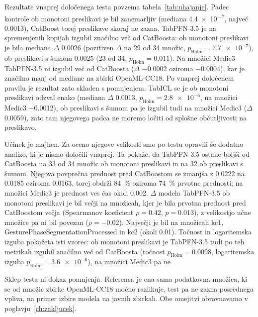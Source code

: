 \documentclass[a4paper,12pt,openright]{book}
\begin{document}
Rezultate vnaprej določenega testa povzema tabela~\ref{tab:uhajanje}. Padec
kontrole ob monotoni preslikavi je bil zanemarljiv (mediana \num{4.4e-7},
največ \num{0.0013}), CatBoost torej preslikave skoraj ne zazna.
TabPFN-3.5 je na spremenjenih kopijah izgubil značilno več od CatBoosta: ob monotoni
preslikavi je bila mediana $\Delta$ \num{0.0026} (pozitiven $\Delta$ na 29 od 34
množic, $p_\mathrm{Holm} = \num{7.7e-7}$), ob preslikavi s šumom \num{0.0025} (23
od 34, $p_\mathrm{Holm} = \num{0.011}$). Na množici Medic3 TabPFN-3.5 ni izgubil
več od CatBoosta ($\Delta$ \num{-0.0002} oziroma \num{-0.0004}), kar je značilno manj od
mediane na zbirki OpenML-CC18. Po vnaprej določenem pravilu je rezultat zato
skladen s pomnjenjem. TabICL se je ob monotoni preslikavi odzval enako (mediana
$\Delta$ \num{0.0013}, $p_\mathrm{Holm} = \num{2.8e-6}$, na množici Medic3
\num{-0.0012}), ob preslikavi s šumom pa je izgubil tudi na množici Medic3
($\Delta$ \num{0.0059}), zato tam njegovega padca ne moremo ločiti od splošne
občutljivosti na preslikavo.



Učinek je majhen. Za oceno njegove velikosti smo po testu opravili še dodatno
analizo, ki je nismo določili vnaprej. Ta pokaže, da TabPFN-3.5 ostane boljši od CatBoosta na 33 od 34 množic ob monotoni preslikavi
in na 32 ob preslikavi s šumom. Njegova povprečna prednost pred CatBoostom se
zmanjša z \num{0.0222} na \num{0.0185} oziroma \num{0.0163}, torej obdrži
\SI{84}{\percent} oziroma \SI{74}{\percent} prvotne prednosti; na množici
Medic3 je prednost ves čas okoli \num{0.002}. $\Delta$ modela TabPFN-3.5 ob
monotoni preslikavi je bil večji na množicah, kjer je bila prvotna prednost
pred CatBoostom večja (Spearmanov koeficient $\rho = \num{0.42}$, $p =
\num{0.013}$), z velikostjo učne množice pa ni bil povezan ($\rho =
\num{-0.02}$). Največji je bil na množicah kc1, GesturePhaseSegmentationProcessed
in kc2 (okoli \num{0.01}). Točnost in logaritemska izguba pokažeta isti vzorec:
ob monotoni preslikavi je TabPFN-3.5 tudi po teh metrikah izgubil značilno več
od CatBoosta (točnost $p_\mathrm{Holm} = \num{0.0098}$, logaritemska izguba
$p_\mathrm{Holm} = \num{3.6e-6}$), na množici Medic3 pa ne.

Sklep testa ni dokaz pomnjenja. Referenca je ena sama podatkovna množica, ki
se od množic zbirke OpenML-CC18 močno razlikuje, test pa ne zazna posrednega
vpliva, na primer izbire modela na javnih zbirkah. Obe omejitvi obravnavamo v
poglavju~\ref{ch:zakljucek}.
\end{document}
